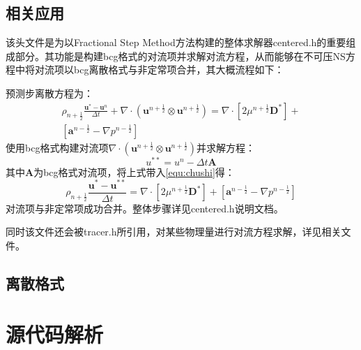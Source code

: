 \documentclass[lang=cn,11pt,a4paper]{elegantpaper}
\begin{document}
\subsection{相关应用}
该头文件是为以Fractional Step Method方法\cite{kim1985application}构建的整体求解器centered.h的重要组成部分。其功能是构建bcg格式的对流项并求解对流方程\cite{bell1989second}\cite{popinet2003gerris}，从而能够在不可压NS方程中将对流项以bcg离散格式与非定常项合并，其大概流程如下：\par
预测步离散方程为：
\begin{equation}\label{equ:chushi}
    \begin{aligned}
    \rho_{n+\frac{1}{2}}\frac{\mathbf{u}^* - \mathbf{u}^{n}}{\Delta t}+\nabla\cdot(\mathbf{u}^{n+\frac{1}{2}}\otimes\mathbf{u}^{n+\frac{1}{2}})= \nabla \cdot [2\mu^{n+\frac{1}{2}}\mathbf{D^*}]+ \\ [\mathbf{a}^{n-\frac{1}{2}}-\nabla p^{n-\frac{1}{2}}]
    \end{aligned}
\end{equation}
使用bcg格式构建对流项$\nabla\cdot(\mathbf{u}^{n+\frac{1}{2}}\otimes\mathbf{u}^{n+\frac{1}{2}})$并求解方程：
\begin{equation}\label{equ:duiliufangcheng}
    u^{**}=u^n-\Delta t \mathbf{A}
\end{equation}
其中$\mathbf{A}$为bcg格式对流项，将上式带入\ref{equ:chushi}得：
\begin{equation}\label{equ:vis}
        \rho_{n+\frac{1}{2}}\frac{\mathbf{u}^* - \mathbf{u}^{**}}{\Delta t}= \nabla \cdot [2\mu^{n+\frac{1}{2}}\mathbf{D^*}]+[\mathbf{a}^{n-\frac{1}{2}}-\nabla p^{n-\frac{1}{2}}]
\end{equation}
对流项与非定常项成功合并。整体步骤详见centered.h说明文档。\par
同时该文件还会被tracer.h所引用，对某些物理量进行对流方程求解，详见相关文件。
\subsection{离散格式}
\section{源代码解析}
\end{document}
